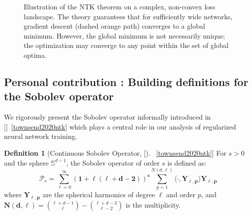 \documentclass[a4paper]{article}
\theoremstyle{plain}
\theoremstyle{definition}
\newtheorem{definition}[theorem]{Definition}
\theoremstyle{remark}
\begin{document}
\begin{figure}[htbp]
    \caption{Illustration of the NTK theorem on a complex, non-convex loss landscape. The theory guarantees that for sufficiently wide networks, gradient descent (dashed orange path) converges to a global minimum. However, the global minimum is not necessarily unique; the optimization may converge to any point within the set of global optima.}
    \label{fig:ntk-global-minima-landscape}
\end{figure}


























\subsection{Personal contribution : Building definitions for the Sobolev operator}

We rigorously present the Sobolev operator informally introduced in []~\ref{townsend2020ntk} which plays a central role in our analysis of regularized neural network training.


\begin{definition}[Continuous Sobolev Operator, []~\ref{townsend2020ntk}]
\label{def:sobolev_continuous}
For $s > 0$ and the sphere $\mathbb{S}^{d-1}$, the Sobolev operator of order $s$ is defined as:
\begin{equation}
\label{eq:sobolev_continuous}
\mathcal{P}_s = \sum_{\ell=0}^{\infty} \boldsymbol{(1 + \ell(\ell + d - 2))^s} \sum_{p=1}^{N(d,\ell)} \langle \cdot, \boldsymbol{Y_{\ell,p}} \rangle \boldsymbol{Y_{\ell,p}}
\end{equation}
where $\boldsymbol{Y_{\ell,p}}$ are the spherical harmonics of degree $\ell$ and order $p$, and $\boldsymbol{N(d,\ell)} = \binom{\ell+d-1}{\ell} - \binom{\ell+d-3}{\ell-2}$ is the multiplicity.
\end{definition}
\end{document}
